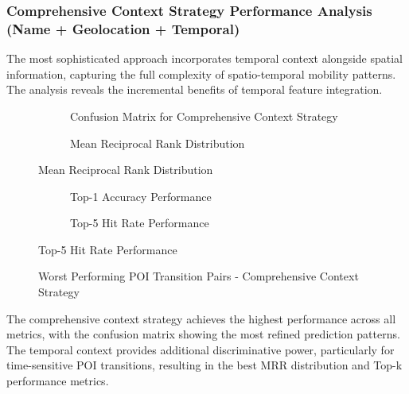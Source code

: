 \documentclass[12pt,a4paper]{article}
\begin{document}
\subsubsection{Comprehensive Context Strategy Performance Analysis (Name + Geolocation + Temporal)}

The most sophisticated approach incorporates temporal context alongside spatial information, capturing the full complexity of spatio-temporal mobility patterns. The analysis reveals the incremental benefits of temporal feature integration.

\begin{figure}[h]
\centering
\begin{subfigure}{0.48\textwidth}
\centering
\caption{Confusion Matrix for Comprehensive Context Strategy}
\label{fig:comprehensive_confusion}
\end{subfigure}
\hfill
\begin{subfigure}{0.48\textwidth}
\centering
\caption{Mean Reciprocal Rank Distribution}
\label{fig:comprehensive_mrr}
\end{subfigure}
\end{figure}

\begin{figure}[h]
\centering
\begin{subfigure}{0.48\textwidth}
\centering
\caption{Top-1 Accuracy Performance}
\label{fig:comprehensive_top1}
\end{subfigure}
\hfill
\begin{subfigure}{0.48\textwidth}
\centering
\caption{Top-5 Hit Rate Performance}
\label{fig:comprehensive_top5}
\end{subfigure}
\end{figure}

\begin{figure}[h]
\centering
\caption{Worst Performing POI Transition Pairs - Comprehensive Context Strategy}
\label{fig:comprehensive_worst_pairs}
\end{figure}

The comprehensive context strategy achieves the highest performance across all metrics, with the confusion matrix showing the most refined prediction patterns. The temporal context provides additional discriminative power, particularly for time-sensitive POI transitions, resulting in the best MRR distribution and Top-k performance metrics.
\end{document}
